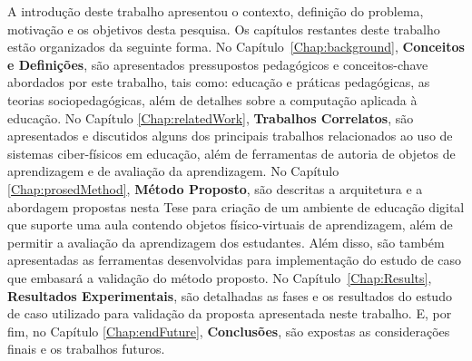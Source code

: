 A introdução deste trabalho apresentou o contexto, definição do problema, motivação e os objetivos desta pesquisa. Os capítulos restantes deste trabalho estão organizados da seguinte forma. 
No Capítulo~\ref{Chap:background}, \textbf{Conceitos e Definições}, são apresentados pressupostos pedagógicos e conceitos-chave abordados por este trabalho, tais como:
educação e práticas pedagógicas, as teorias sociopedagógicas, além de detalhes sobre a computação aplicada à educação.
No Capítulo \ref{Chap:relatedWork}, \textbf{Trabalhos Correlatos}, são apresentados e discutidos alguns dos principais trabalhos relacionados ao uso de sistemas ciber-físicos em educação, além de ferramentas de autoria de objetos de aprendizagem e de avaliação da aprendizagem.
No Capítulo \ref{Chap:prosedMethod}, \textbf{Método Proposto}, são descritas a arquitetura e a abordagem propostas nesta Tese para criação de um ambiente de educação digital que suporte uma aula contendo objetos físico-virtuais de aprendizagem, além de permitir a avaliação da aprendizagem dos estudantes. Além disso, são também apresentadas as ferramentas desenvolvidas para implementação do estudo de caso que embasará a validação do método proposto.
No Capítulo~\ref{Chap:Results}, \textbf{Resultados Experimentais}, são detalhadas as fases e os resultados do estudo de caso utilizado para validação da proposta apresentada neste trabalho.
E, por fim, no Capítulo \ref{Chap:endFuture}, \textbf{Conclusões}, são expostas as considerações finais e os trabalhos futuros.